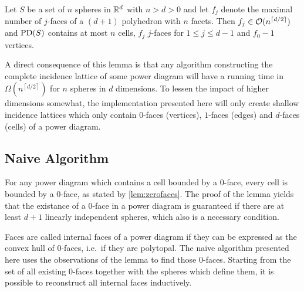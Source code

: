 \begin{lemma}
    \label{lem:latticesexponential}
    Let $S$ be a set of $n$ spheres in $\mathbb{R}^d$ with $n > d > 0$ and let $f_j$ denote the maximal number of $j$-faces of a $(d + 1)$ polyhedron with $n$ facets. Then $f_j \in \mathcal{O}(n^{\left\lceil d/2 \right\rceil})$ and $\operatorname{PD}(S)$ contains at most $n$ cells, $f_j$ $j$-faces for $1 \leq j \leq d-1$ and $f_0 - 1$ vertices.
\end{lemma}

A direct consequence of this lemma is that any algorithm constructing the complete incidence lattice of some power diagram will have a running time in $\Omega(n^{\left\lceil d/2 \right\rceil})$ for $n$ spheres in $d$ dimensions.
To lessen the impact of higher dimensions somewhat, the implementation presented here will only create shallow incidence lattices which only contain $0$-faces (vertices), $1$-faces (edges) and $d$-faces (cells) of a power diagram.

\subsection{Naive Algorithm}
\label{sub:naive_algorithm}
For any power diagram which contains a cell bounded by a $0$-face, every cell is bounded by a $0$-face, as stated by \cref{lem:zerofaces}.
The proof of the lemma yields that the existance of a $0$-face in a power diagram is guaranteed if there are at least $d+1$ linearly independent spheres, which also is a necessary condition.

Faces are called internal faces of a power diagram if they can be expressed as the convex hull of $0$-faces, i.e.~if they are polytopal.
The naive algorithm presented here uses the observations of the lemma to find those $0$-faces.
Starting from the set of all existing $0$-faces together with the spheres which define them, it is possible to reconstruct all internal faces inductively.

